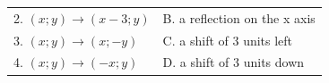 {{\begin{center}
\begin{tabular}[t]{|l|l|}
    
        2.
                    $\left(x;y\right)\to \left(x-3;y\right)$
                   &
    
    
        B. a reflection on the x axis%
     \tabularnewline\cline{1-1}\cline{2-2}
    
    
        3.
                    $\left(x;y\right)\to \left(x;-y\right)$
                   &
    
    
        C. a shift of 3 units left%
     \tabularnewline\cline{1-1}\cline{2-2}
    
    
        4.
                    $\left(x;y\right)\to \left(-x;y\right)$
                   &
    
    
        D. a shift of 3 units down%
     \tabularnewline\cline{1-1}\cline{2-2}
    
    
        

\end{tabular}
\end{center}}}

